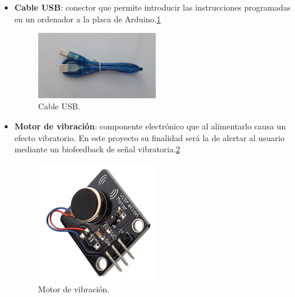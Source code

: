 \begin{itemize}
\item \textbf{Cable USB}: conector que permite introducir las instrucciones programadas en un ordenador a la placa de Arduino.\ref{fig:cableUSB}
\begin{figure}[h!]
    \centering
    \includegraphics[width=0.5\textwidth]{img/imgCableUSB.jpg}
    \caption{Cable USB.}
    \label{fig:cableUSB} %
\end{figure}

\item \textbf{Motor de vibración}: componente electrónico que al alimentarlo causa un efecto vibratorio. En este proyecto su finalidad será la de alertar al usuario mediante un biofeedback de señal vibratoria.\ref{fig:motorVibr}
\begin{figure}[h!]
    \centering
    \includegraphics[width=0.5\textwidth]{img/MotorVibr.jpg}
    \caption{Motor de vibración.\cite{imgMotorVibr}}
    \label{fig:motorVibr} %
\end{figure}


\end{itemize}
